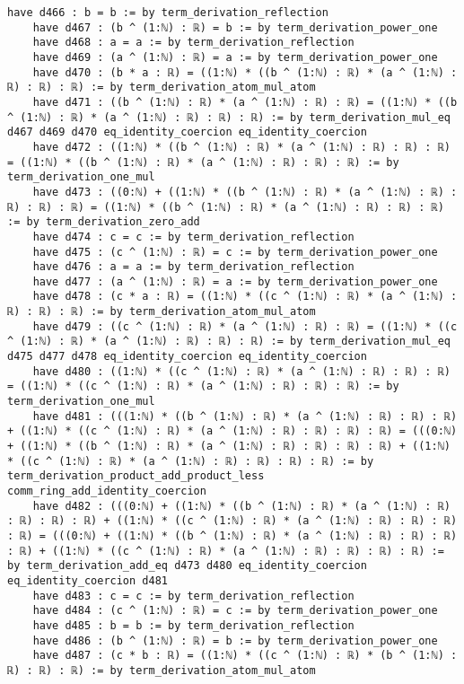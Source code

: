 \documentclass{article}
\begin{document}
\begin{tcolorbox}[colback=white!10, width=\linewidth]
\begin{lstlisting}[language=Lean4]
    have d466 : b = b := by term_derivation_reflection
    have d467 : (b ^ (1:ℕ) : ℝ) = b := by term_derivation_power_one
    have d468 : a = a := by term_derivation_reflection
    have d469 : (a ^ (1:ℕ) : ℝ) = a := by term_derivation_power_one
    have d470 : (b * a : ℝ) = ((1:ℕ) * ((b ^ (1:ℕ) : ℝ) * (a ^ (1:ℕ) : ℝ) : ℝ) : ℝ) := by term_derivation_atom_mul_atom
    have d471 : ((b ^ (1:ℕ) : ℝ) * (a ^ (1:ℕ) : ℝ) : ℝ) = ((1:ℕ) * ((b ^ (1:ℕ) : ℝ) * (a ^ (1:ℕ) : ℝ) : ℝ) : ℝ) := by term_derivation_mul_eq d467 d469 d470 eq_identity_coercion eq_identity_coercion
    have d472 : ((1:ℕ) * ((b ^ (1:ℕ) : ℝ) * (a ^ (1:ℕ) : ℝ) : ℝ) : ℝ) = ((1:ℕ) * ((b ^ (1:ℕ) : ℝ) * (a ^ (1:ℕ) : ℝ) : ℝ) : ℝ) := by term_derivation_one_mul
    have d473 : ((0:ℕ) + ((1:ℕ) * ((b ^ (1:ℕ) : ℝ) * (a ^ (1:ℕ) : ℝ) : ℝ) : ℝ) : ℝ) = ((1:ℕ) * ((b ^ (1:ℕ) : ℝ) * (a ^ (1:ℕ) : ℝ) : ℝ) : ℝ) := by term_derivation_zero_add
    have d474 : c = c := by term_derivation_reflection
    have d475 : (c ^ (1:ℕ) : ℝ) = c := by term_derivation_power_one
    have d476 : a = a := by term_derivation_reflection
    have d477 : (a ^ (1:ℕ) : ℝ) = a := by term_derivation_power_one
    have d478 : (c * a : ℝ) = ((1:ℕ) * ((c ^ (1:ℕ) : ℝ) * (a ^ (1:ℕ) : ℝ) : ℝ) : ℝ) := by term_derivation_atom_mul_atom
    have d479 : ((c ^ (1:ℕ) : ℝ) * (a ^ (1:ℕ) : ℝ) : ℝ) = ((1:ℕ) * ((c ^ (1:ℕ) : ℝ) * (a ^ (1:ℕ) : ℝ) : ℝ) : ℝ) := by term_derivation_mul_eq d475 d477 d478 eq_identity_coercion eq_identity_coercion
    have d480 : ((1:ℕ) * ((c ^ (1:ℕ) : ℝ) * (a ^ (1:ℕ) : ℝ) : ℝ) : ℝ) = ((1:ℕ) * ((c ^ (1:ℕ) : ℝ) * (a ^ (1:ℕ) : ℝ) : ℝ) : ℝ) := by term_derivation_one_mul
    have d481 : (((1:ℕ) * ((b ^ (1:ℕ) : ℝ) * (a ^ (1:ℕ) : ℝ) : ℝ) : ℝ) + ((1:ℕ) * ((c ^ (1:ℕ) : ℝ) * (a ^ (1:ℕ) : ℝ) : ℝ) : ℝ) : ℝ) = (((0:ℕ) + ((1:ℕ) * ((b ^ (1:ℕ) : ℝ) * (a ^ (1:ℕ) : ℝ) : ℝ) : ℝ) : ℝ) + ((1:ℕ) * ((c ^ (1:ℕ) : ℝ) * (a ^ (1:ℕ) : ℝ) : ℝ) : ℝ) : ℝ) := by term_derivation_product_add_product_less comm_ring_add_identity_coercion
    have d482 : (((0:ℕ) + ((1:ℕ) * ((b ^ (1:ℕ) : ℝ) * (a ^ (1:ℕ) : ℝ) : ℝ) : ℝ) : ℝ) + ((1:ℕ) * ((c ^ (1:ℕ) : ℝ) * (a ^ (1:ℕ) : ℝ) : ℝ) : ℝ) : ℝ) = (((0:ℕ) + ((1:ℕ) * ((b ^ (1:ℕ) : ℝ) * (a ^ (1:ℕ) : ℝ) : ℝ) : ℝ) : ℝ) + ((1:ℕ) * ((c ^ (1:ℕ) : ℝ) * (a ^ (1:ℕ) : ℝ) : ℝ) : ℝ) : ℝ) := by term_derivation_add_eq d473 d480 eq_identity_coercion eq_identity_coercion d481
    have d483 : c = c := by term_derivation_reflection
    have d484 : (c ^ (1:ℕ) : ℝ) = c := by term_derivation_power_one
    have d485 : b = b := by term_derivation_reflection
    have d486 : (b ^ (1:ℕ) : ℝ) = b := by term_derivation_power_one
    have d487 : (c * b : ℝ) = ((1:ℕ) * ((c ^ (1:ℕ) : ℝ) * (b ^ (1:ℕ) : ℝ) : ℝ) : ℝ) := by term_derivation_atom_mul_atom

\end{lstlisting}
\end{tcolorbox}
\end{document}
